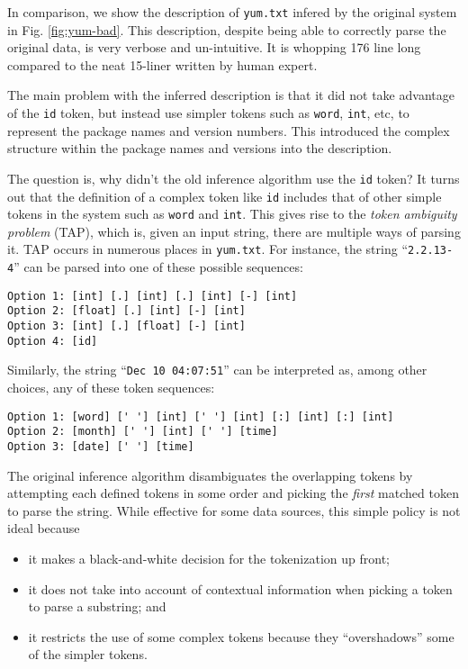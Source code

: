 In comparison, we show the description of {\tt yum.txt} infered by
the original \learnpads{} system \cite{fisher+:dirttoshovels,fisher+:sigmod08}
in Fig. \ref{fig:yum-bad}. 
This description, despite being able to correctly parse the original data,
is very verbose and un-intuitive. It is whopping 176 line long compared 
to the neat 15-liner written by human expert.

The main problem with the inferred description is that it 
did not take advantage of the {\tt id} token, but instead 
use simpler tokens such as {\tt word}, {\tt int}, etc,
to represent the package names and version numbers. 
This introduced the complex structure within the package names 
and versions into the description. 

The question is, why didn't the old inference algorithm use
the {\tt id} token? It turns out that the definition of a complex token
like {\tt id} includes that of other simple tokens in the system such as 
{\tt word} and {\tt int}. This gives rise to the 
{\em token ambiguity problem} (TAP), which is, given an input
string, there are multiple ways of parsing it.
TAP occurs in numerous places in {\tt yum.txt}. 
For instance, the string ``{\tt 2.2.13-4}'' can be parsed into one of 
these possible sequences:
{\small
\begin{verbatim}
Option 1: [int] [.] [int] [.] [int] [-] [int]
Option 2: [float] [.] [int] [-] [int]
Option 3: [int] [.] [float] [-] [int]
Option 4: [id]
\end{verbatim}
}

Similarly, the string ``{\tt Dec 10 04:07:51}'' can be interpreted as, 
among other choices, any of these token sequences:

{\small
\begin{verbatim}
Option 1: [word] [' '] [int] [' '] [int] [:] [int] [:] [int]
Option 2: [month] [' '] [int] [' '] [time]
Option 3: [date] [' '] [time]
\end{verbatim}
}

The original inference algorithm disambiguates the overlapping
tokens by attempting each defined tokens in some order 
and picking the {\em first} matched token to parse the string. 
While effective for some data sources, this simple policy 
is not ideal because
\begin{itemize}
\item it makes a black-and-white decision for the tokenization up front;
\item it does not take into account of contextual information when picking
      a token to parse a substring; and
\item it restricts the use of some complex tokens because they ``overshadows''
	some of the simpler tokens.
\end{itemize}

